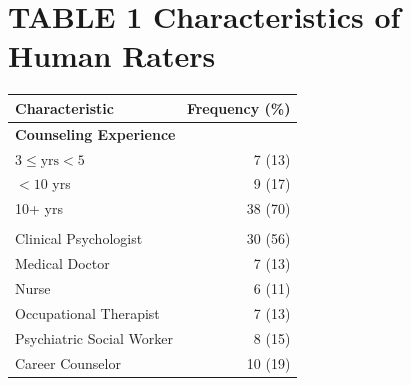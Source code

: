\documentclass{wiley-article}
\begin{document}


% 
% 



\clearpage                %

\begin{table}[htbp]
  \section*{TABLE 1 Characteristics of Human Raters}
  \centering
  \label{tab:human_rater_characteristics}
  \begin{tabular}{l r}
    \toprule
    \textbf{Characteristic} & \textbf{Frequency (\%)}\\
    \midrule
    \multicolumn{2}{l}{\textbf{Counseling Experience}}\\
    $3 \le \text{yrs} < 5$ & 7 (13)\\
    $< 10$ yrs             & 9 (17)\\
    10+ yrs                & 38 (70)\\
    \addlinespace
    \multicolumn{2}{l}{\textbf{Certificate}}\\
    Clinical Psychologist      & 30 (56)\\
    Medical Doctor             & 7 (13)\\
    Nurse                      & 6 (11)\\
    Occupational Therapist     & 7 (13)\\
    Psychiatric Social Worker  & 8 (15)\\
    Career Counselor           & 10 (19)\\
    \bottomrule
  \end{tabular}
\end{table}
\end{document}
